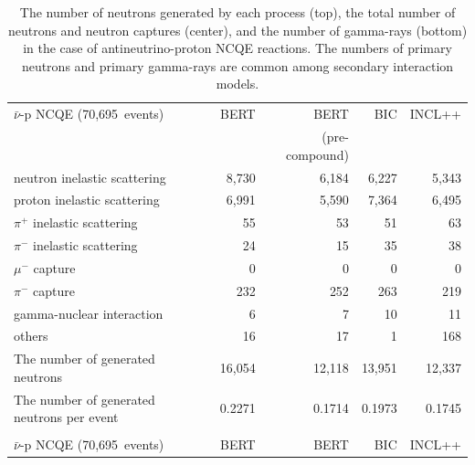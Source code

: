 \begin{table}[h]
	\centering
	\caption[The number of neutrons generated by each process, the total number of neutrons and neutron captures, and the number of gamma-rays in the case of antineutrino-proton NCQE reactions]{
	The number of neutrons generated by each process (top), the total number of neutrons and neutron captures (center), and the number of gamma-rays (bottom) in the case of antineutrino-proton NCQE reactions.
	The numbers of primary neutrons and primary gamma-rays are common among secondary interaction models.
	}\label{Others_tab:pre_gamma_nubncqe_p}
	\vs
	\begin{tabular}{lrrrr} \hline \hline
		$\bar{\nu}$-p NCQE (70,695~events)                  &    BERT &           BERT &     BIC &  INCL++ \\
		                                                    &         & (pre-compound) &         &         \\ \hline
		neutron inelastic scattering                        &   8,730 &          6,184 &   6,227 &   5,343 \\
		proton inelastic scattering                         &   6,991 &          5,590 &   7,364 &   6,495 \\
		$\pi^{+}$ inelastic scattering                      &      55 &             53 &      51 &      63 \\
		$\pi^{-}$ inelastic scattering                      &      24 &             15 &      35 &      38 \\
		$\mu^{-}$ capture                                   &       0 &              0 &       0 &       0 \\
		$\pi^{-}$ capture                                   &     232 &            252 &     263 &     219 \\
		gamma-nuclear interaction                           &       6 &              7 &      10 &      11 \\
		others                                              &      16 &             17 &       1 &     168 \\ \hline
		The number of generated neutrons                    &  16,054 &         12,118 &  13,951 &  12,337 \\ \hline
		The number of generated neutrons per event          &  0.2271 &         0.1714 &  0.1973 &  0.1745 \\ \hline \hline
		&&& \\ \hline \hline
		$\bar{\nu}$-p NCQE (70,695~events)                  &    BERT &           BERT &     BIC &  INCL++ \\

\end{tabular}
\end{table}
